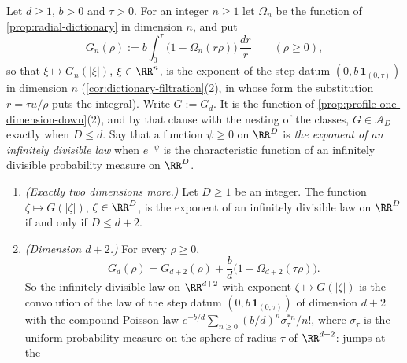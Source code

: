 \begin{proposition}
\label{prop:step-exponent-dimensions}
Let $d \ge 1$, $b > 0$ and $\tau > 0$. For an integer $n \ge 1$ let $\Omega_n$ be the function of
\ref{prop:radial-dictionary} in dimension $n$, and put
\[
  G_n(\rho) := b\int_0^\tau \bigl(1 - \Omega_n(r\rho)\bigr)\,\frac{dr}{r} \qquad (\rho \ge 0) ,
\]
so that $\xi \mapsto G_n(|\xi|)$, $\xi \in \RR^n$, is the exponent of the step datum
$(0, b\,\mathbf 1_{(0,\tau)})$ in dimension $n$ (\ref{cor:dictionary-filtration}(2), in whose
form the substitution $r = \tau u/\rho$ puts the integral). Write
$G := G_d$. It is the function of \ref{prop:profile-one-dimension-down}(2), and by that clause
with the nesting of the classes, $G \in \mathcal{A}_D$ exactly when $D \le d$. Say that a
function $\psi \ge 0$ on $\RR^D$ is \emph{the exponent of an infinitely divisible law} when
$e^{-\psi}$ is the characteristic function of an infinitely divisible probability measure on
$\RR^D$.
\begin{enumerate}
\item \emph{(Exactly two dimensions more.)} Let $D \ge 1$ be an integer. The function
$\zeta \mapsto G(|\zeta|)$, $\zeta \in \RR^D$, is the exponent of an infinitely divisible law on
$\RR^D$ if and only if $D \le d + 2$.
\item \emph{(Dimension $d + 2$.)} For every $\rho \ge 0$,
\begin{equation}\label{eq:step-exponent-two-up}
  G_d(\rho) = G_{d+2}(\rho) + \frac{b}{d}\bigl(1 - \Omega_{d+2}(\tau\rho)\bigr) .
\end{equation}
So the infinitely divisible law on $\RR^{d+2}$ with exponent $\zeta \mapsto G(|\zeta|)$ is the
convolution of the law of the step datum $(0, b\,\mathbf 1_{(0,\tau)})$ of dimension $d + 2$ with
the compound Poisson law $e^{-b/d}\sum_{n \ge 0}(b/d)^n\sigma_\tau^{*n}/n!$, where $\sigma_\tau$
is the uniform probability measure on the sphere of radius $\tau$ of $\RR^{d+2}$: jumps at the

\end{enumerate}
\end{proposition}

